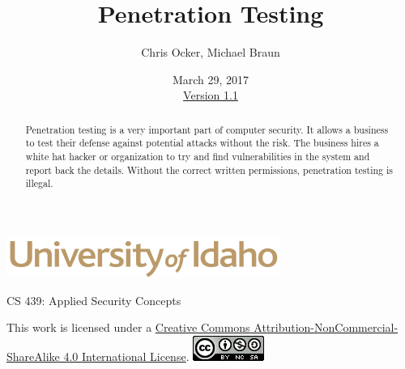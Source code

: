 \documentclass[12pt]{extarticle}
\begin{document}
\title{ Penetration Testing }
\author{Chris Ocker, Michael Braun}
\date{March 29, 2017 \\ \hyperref[changelog]{Version 1.1}} %
\renewcommand{\abstractname}{Executive Summary}
\begin{titlepage}
\maketitle
{}
\begin{center}
\includegraphics[scale=.5]{UofI}

\large{CS 439: Applied Security Concepts}

\vskip 40pt

\end{center}
\begin{abstract}


Penetration testing is a very important part of computer security. It allows a business to test their defense against potential attacks without the risk. The business hires a white hat hacker or organization to try and find vulnerabilities in the system and report back the details. Without the correct written permissions, penetration testing is illegal.

\end{abstract}


\vfill
\begin{center}
	This work is licensed under a \href{https://creativecommons.org/licenses/by-nc-sa/4.0/legalcode}{Creative Commons Attribution-NonCommercial-ShareAlike 4.0 International License}.
	\vskip 10pt
	\includegraphics[scale=.5]{cc}
\end{center}

\end{titlepage}


\pagebreak
\tableofcontents

\end{document}

